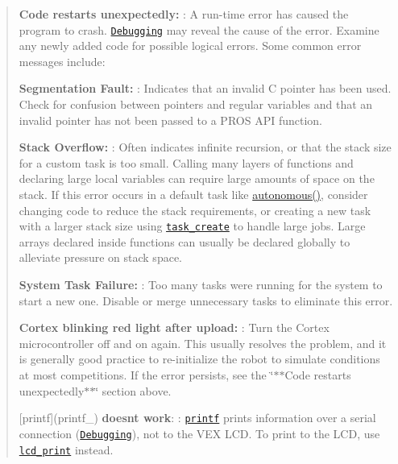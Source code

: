 \begin{quote}
\begin{DoxyItemize}
\item {\bfseries Code restarts unexpectedly\+:} \+: A run-\/time error has caused the program to crash. \href{./debugging}{\tt Debugging} may reveal the cause of the error. Examine any newly added code for possible logical errors. Some common error messages include\+:
\begin{DoxyItemize}
\item {\bfseries Segmentation Fault\+:} \+: Indicates that an invalid C pointer has been used. Check for confusion between pointers and regular variables and that an invalid pointer has not been passed to a P\+R\+OS A\+PI function.
\item {\bfseries Stack Overflow\+:} \+: Often indicates infinite recursion, or that the stack size for a custom task is too small. Calling many layers of functions and declaring large local variables can require large amounts of space on the stack. If this error occurs in a default task like {\ttfamily \hyperlink{main_8h_a2df3d06bc5bced154da27fce393f991f}{autonomous()}}, consider changing code to reduce the stack requirements, or creating a new task with a larger stack size using \href{../../api/c/rtos.html#task_create}{\tt task\+\_\+create} to handle large jobs. Large arrays declared inside functions can usually be declared globally to alleviate pressure on stack space.
\item {\bfseries System Task Failure\+:} \+: Too many tasks were running for the system to start a new one. Disable or merge unnecessary tasks to eliminate this error.
\end{DoxyItemize}
\item {\bfseries Cortex blinking red light after upload\+:} \+: Turn the Cortex microcontroller off and on again. This usually resolves the problem, and it is generally good practice to re-\/initialize the robot to simulate conditions at most competitions. If the error persists, see the \char`\"{}$\ast$$\ast$\+Code restarts
  unexpectedly$\ast$$\ast$\char`\"{} section above.
\item \mbox{[}printf\mbox{]}(printf\+\_\+) {\bfseries doesn\textquotesingle{}t work}\+: \+: \href{http://www.cplusplus.com/reference/cstdio/printf/}{\tt printf} prints information over a serial connection (\href{../tutorials/general/debugging}{\tt Debugging}), not to the V\+EX L\+CD. To print to the L\+CD, use \href{../../api/c/llemu.html#lcd-print}{\tt lcd\+\_\+print} instead.
\end{DoxyItemize}\end{quote}
